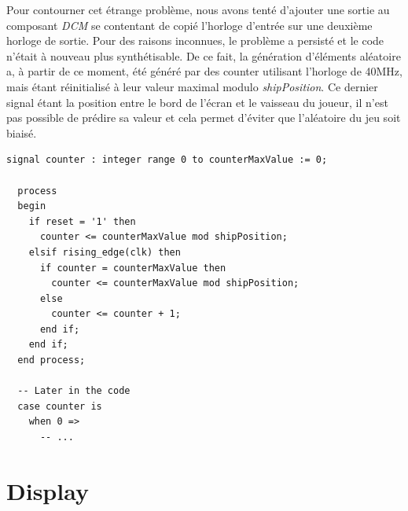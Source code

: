 \documentclass[french]{nakrule}
\begin{document}
Pour contourner cet étrange problème, nous avons tenté d'ajouter une sortie au
composant \emph{DCM} se contentant de copié l'horloge d'entrée sur une deuxième
horloge de sortie. Pour des raisons inconnues, le problème a persisté et le code
n'était à nouveau plus synthétisable. De ce fait, la génération d'éléments
aléatoire a, à partir de ce moment, été généré par des counter utilisant
l'horloge de 40MHz, mais étant réinitialisé à leur valeur maximal modulo
\emph{shipPosition}. Ce dernier signal étant la position entre le bord de
l'écran et le vaisseau du joueur, il n'est pas possible de prédire sa valeur et
cela permet d'éviter que l'aléatoire du jeu soit biaisé.

\begin{lstlisting}[style=vhdl, caption=Génération d'aléatoire]
  signal counter : integer range 0 to counterMaxValue := 0;
  
  process
  begin
    if reset = '1' then
      counter <= counterMaxValue mod shipPosition;
    elsif rising_edge(clk) then
      if counter = counterMaxValue then
        counter <= counterMaxValue mod shipPosition;
      else
        counter <= counter + 1;
      end if;
    end if;
  end process;

  -- Later in the code
  case counter is
    when 0 =>
      -- ...
\end{lstlisting}

\clearpage

\section{Display}
\label{sec:display}
\end{document}
